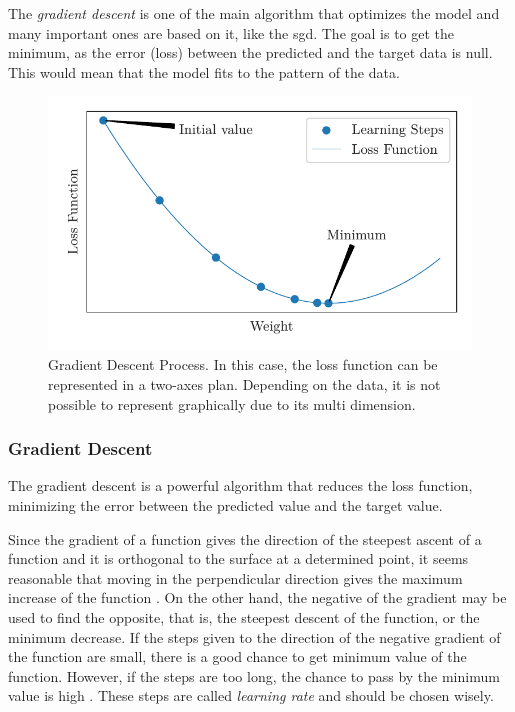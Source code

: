 The \emph{gradient descent} is one of the main algorithm \citep{nesterov2004} that optimizes the model and many important ones are based on it, like the \gls*{sgd}. The goal is to get the minimum, as the error (loss) between the predicted and the target data is null. This would mean that the model fits to the pattern of the data.
%
\begin{figure}[!htb]
    \centering
    \includegraphics{figures/3review/nn/gradient_descent.pdf}
    \caption[Gradient Descent Process]{Gradient Descent Process. In this case, the loss function can be represented in a two-axes plan. Depending on the data, it is not possible to represent graphically due to its multi dimension.}
\end{figure}

\subsubsection*{Gradient Descent} 

The gradient descent is a powerful algorithm that reduces the loss function, minimizing the error between the predicted value and the target value.

Since the gradient of a function gives the direction of the steepest ascent of a function and it is orthogonal to the surface at a determined point, it seems reasonable that moving in the perpendicular direction gives the maximum increase of the function \cite{stewart2016}.
On the other hand, the negative of the gradient may be used to find the opposite, that is, the steepest descent of the function, or the minimum decrease.
If the steps given to the direction of the negative gradient of the function are small, there is a good chance to get minimum value of the function.
However, if the steps are too long, the chance to pass by the minimum value is high \citep{nielsen2015}.
These steps are called \emph{learning rate} and should be chosen wisely.

